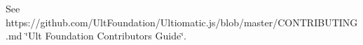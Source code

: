 See https\+://github.com/\+Ult\+Foundation/\+Ultiomatic.\+js/blob/master/\+C\+O\+N\+T\+R\+I\+B\+U\+T\+I\+NG.md \char`\"{}\+Ult Foundation Contributor\textquotesingle{}s Guide\char`\"{}. 